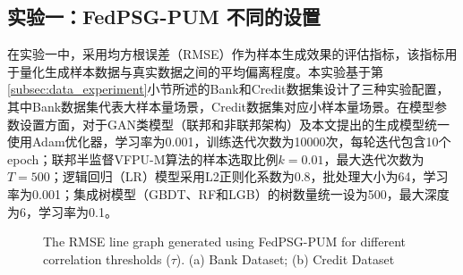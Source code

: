 \subsection{实验一：FedPSG-PUM 不同的设置}
在实验一中，采用均方根误差（RMSE）作为样本生成效果的评估指标，该指标用于量化生成样本数据与真实数据之间的平均偏离程度。本实验基于第\ref{subsec:data_experiment}小节所述的Bank和Credit数据集设计了三种实验配置，其中Bank数据集代表大样本量场景，Credit数据集对应小样本量场景。在模型参数设置方面，对于GAN类模型（联邦和非联邦架构）及本文提出的生成模型统一使用Adam优化器，学习率为0.001，训练迭代次数为10000次，每轮迭代包含10个epoch；联邦半监督VFPU-M算法的样本选取比例$k=0.01$，最大迭代次数为$T=500$；逻辑回归（LR）模型采用L2正则化系数为0.8，批处理大小为64，学习率为0.001；集成树模型（GBDT、RF和LGB）的树数量统一设为500，最大深度为6，学习率为0.1。

\vspace{-0.1cm}
\begin{figure}[H]
	\centering
	\hspace{0.01\textwidth}  %
	
	{\centering \wuhao The RMSE line graph generated using FedPSG-PUM for different correlation thresholds ($\tau$). (a) Bank Dataset; (b) Credit Dataset}    
	\label{Chapter4Exp1Setting1}
\end{figure}
\vspace{-0.35cm}

